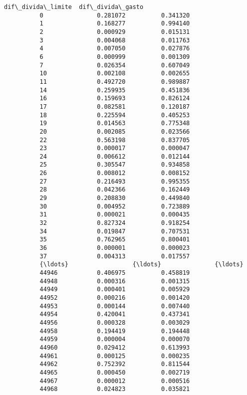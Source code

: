 \documentclass[11pt]{article}
\begin{document}
\begin{Verbatim}[commandchars=\\\{\}]
                 dif\_divida\_limite  dif\_divida\_gasto  
          0               0.281072          0.341320  
          1               0.168277          0.994140  
          2               0.000929          0.015131  
          3               0.004068          0.011763  
          4               0.007050          0.027876  
          6               0.000999          0.001309  
          7               0.026354          0.607049  
          10              0.002108          0.002655  
          11              0.492720          0.989887  
          14              0.259935          0.451836  
          16              0.159693          0.826124  
          17              0.082581          0.120187  
          18              0.225594          0.405253  
          19              0.014563          0.775348  
          20              0.002085          0.023566  
          22              0.563198          0.837705  
          23              0.000017          0.000047  
          24              0.006612          0.012144  
          25              0.305547          0.934858  
          26              0.008012          0.008152  
          27              0.216493          0.995355  
          28              0.042366          0.162449  
          29              0.208830          0.449840  
          30              0.004952          0.723889  
          31              0.000021          0.000435  
          32              0.827324          0.918254  
          34              0.019847          0.707531  
          35              0.762965          0.800401  
          36              0.000001          0.000023  
          37              0.004313          0.017557  
          {\ldots}                  {\ldots}               {\ldots}  
          44946           0.406975          0.458819  
          44948           0.000316          0.001315  
          44949           0.000401          0.005929  
          44952           0.000216          0.001420  
          44953           0.000144          0.007440  
          44954           0.420041          0.437341  
          44956           0.000328          0.003029  
          44958           0.194419          0.194448  
          44959           0.000004          0.000070  
          44960           0.029412          0.613993  
          44961           0.000125          0.000235  
          44962           0.752392          0.811544  
          44965           0.000450          0.002719  
          44967           0.000012          0.000516  
          44968           0.024823          0.035821  

\end{Verbatim}
\end{document}
